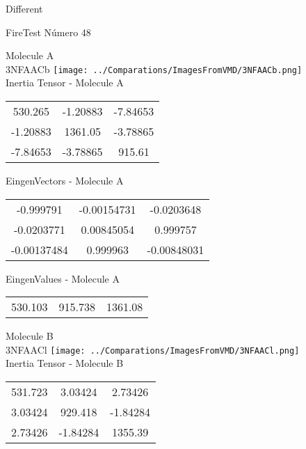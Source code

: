 \begin{center}
\vtab
\vtab
\textcolor{NavyBlue}{\Large Different}
\end{center}

 \newpage

\vtab[-2cm]
\begin{center}
{\large FireTest \tab Número 48}
\end{center}
\begin{multicols}{2}
\begin{center}

Molecule A \\ 
3NFAACb
\texttt{[image: ../Comparations/ImagesFromVMD/3NFAACb.png]}
\\
Inertia Tensor - Molecule A \\
\vtab

\begin{tabular}{|c c c|}
530.265	 & 	-1.20883	 & 	-7.84653	 \\
-1.20883	 & 	1361.05	 & 	-3.78865	 \\
-7.84653	 & 	-3.78865	 & 	915.61
\end{tabular}

\vtab
 EingenVectors - Molecule A     \\
\vtab
\begin{tabular}{|c c c|}
-0.999791	 & 	-0.00154731	 & 	-0.0203648	 \\
-0.0203771	 & 	0.00845054	 & 	0.999757	 \\
-0.00137484	 & 	0.999963	 & 	-0.00848031
\end{tabular}

\vtab
 EingenValues - Molecule A     \\
\vtab
\begin{tabular}{|c c c|}
530.103	 & 	915.738	 & 	1361.08	 \\
\end{tabular}
\columnbreak

Molecule B \\ 
3NFAACl
\texttt{[image: ../Comparations/ImagesFromVMD/3NFAACl.png]}
\\
Inertia Tensor - Molecule B \\
\vtab

\begin{tabular}{|c c c|}
531.723	 & 	3.03424	 & 	2.73426	 \\
3.03424	 & 	929.418	 & 	-1.84284	 \\
2.73426	 & 	-1.84284	 & 	1355.39
\end{tabular}


\end{center}
\end{multicols}
